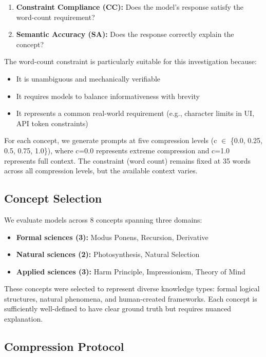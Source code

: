 \documentclass[11pt]{article}
\begin{document}
\begin{enumerate}
\item \textbf{Constraint Compliance (CC):} Does the model's response satisfy the word-count requirement?
\item \textbf{Semantic Accuracy (SA):} Does the response correctly explain the concept?
\end{enumerate}

The word-count constraint is particularly suitable for this investigation because:
\begin{itemize}
\item It is unambiguous and mechanically verifiable
\item It requires models to balance informativeness with brevity
\item It represents a common real-world requirement (e.g., character limits in UI, API token constraints)
\end{itemize}

For each concept, we generate prompts at five compression levels (c $\in$ \{0.0, 0.25, 0.5, 0.75, 1.0\}), where c=0.0 represents extreme compression and c=1.0 represents full context. The constraint (word count) remains fixed at 35 words across all compression levels, but the available context varies.

\subsection{Concept Selection}

We evaluate models across 8 concepts spanning three domains:

\begin{itemize}
\item \textbf{Formal sciences (3):} Modus Ponens, Recursion, Derivative
\item \textbf{Natural sciences (2):} Photosynthesis, Natural Selection
\item \textbf{Applied sciences (3):} Harm Principle, Impressionism, Theory of Mind
\end{itemize}

These concepts were selected to represent diverse knowledge types: formal logical structures, natural phenomena, and human-created frameworks. Each concept is sufficiently well-defined to have clear ground truth but requires nuanced explanation.

\subsection{Compression Protocol}
\end{document}
